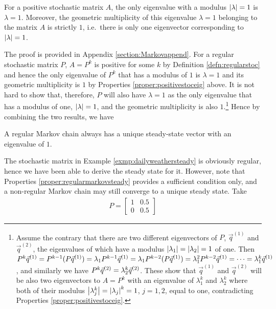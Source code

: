 \begin{proper}
\label{proper:positivestoceig}
For a positive stochastic matrix $A$, the only eigenvalue with a modulus $\abs{\lambda} = 1$ is $\lambda = 1$. Moreover, the geometric multiplicity of this eigenvalue $\lambda = 1$ belonging to the matrix $A$ is strictly $1$, i.e.\ there is only one eigenvector corresponding to $\abs{\lambda} = 1$.
\end{proper}
The proof is provided in Appendix \ref{section:Markovappend}. For a regular stochastic matrix $P$, $A = P^k$ is positive for some $k$ by Definition \ref{defn:regularstoc} and hence the only eigenvalue of $P^k$ that has a modulus of $1$ is $\lambda = 1$ and its geometric multiplicity is $1$ by Properties \ref{proper:positivestoceig} above. It is not hard to show that, therefore, $P$ will also have $\lambda = 1$ as the only eigenvalue that has a modulus of one, $\abs{\lambda} = 1$, and the geometric multiplicity is also $1$.\footnote{Assume the contrary that there are two different eigenvectors of $P$, $\vec{q}^{(1)}$ and $\vec{q}^{(2)}$, the eigenvalues of which have a modulus $\abs{\lambda_1} = \abs{\lambda_2} = 1$ of one. Then $\smash{P^k\vec{q}^{(1)}} = \smash{P^{k-1}(P\vec{q}^{(1)})} = \lambda_1 \smash{P^{k-1}\vec{q}^{(1)}} = \lambda_1 \smash{P^{k-2} (P\vec{q}^{(1)})} = \smash{\lambda_1^2 P^{k-2}\vec{q}^{(1)}} = \cdots = \smash{\lambda_1^k} \vec{q}^{(1)}$, and similarly we have $P^k\vec{q}^{(2)} = \smash{\lambda_2^k} \vec{q}^{(2)}$. These show that $\vec{q}^{(1)}$ and $\vec{q}^{(2)}$ will be also two eigenvectors to $A = P^k$ with an eigenvalue of $\lambda_1^k$ and $\lambda_2^k$ where both of their modulus $\smash{\abs{\lambda_j^k}} = \abs{\lambda_j}^k = 1$, $j = 1,2$, equal to one, contradicting Properties \ref{proper:positivestoceig}.} Hence by combining the two results, we have
\begin{proper}
\label{proper:regularmarkovsteady}
A regular Markov chain always has a unique steady-state vector with an eigenvalue of $1$.  
\end{proper}
The stochastic matrix in Example \ref{exmp:dailyweathersteady} is obviously regular, hence we have been able to derive the steady state for it. However, note that Properties \ref{proper:regularmarkovsteady} provides a sufficient condition only, and a non-regular Markov chain may still converge to a unique steady state. Take
\begin{align*}
P = 
\begin{bmatrix}
1 & 0.5 \\
0 & 0.5
\end{bmatrix}
\end{align*}
